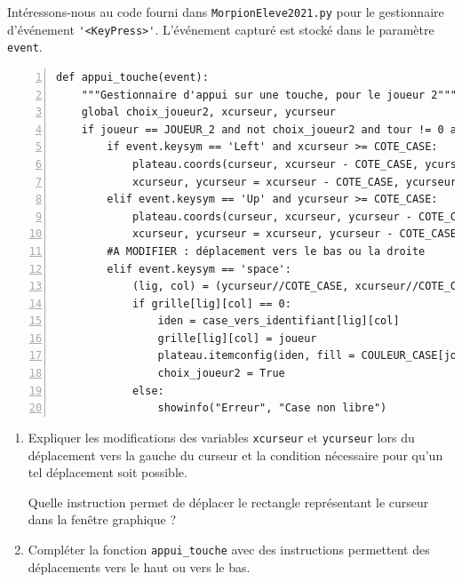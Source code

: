 \documentclass[a4paper, french, 12pt]{article}  %
\newcounter{exo}
\newcounter{exoB}
\newenvironment{exerciceB2}
{\par \bigskip  \noindent \addtocounter{exoB}{1} \hrulefill \quad { \large \textbf{Exercice \theexoB}} \quad \hrulefill \par \medskip }
{\par \bigskip }
\newcounter{def}
\begin{document}
\begin{exerciceB2}{}

Intéressons-nous au code fourni dans \lstinline+MorpionEleve2021.py+ pour le gestionnaire d'événement  \lstinline+'<KeyPress>'+. L'événement capturé est stocké dans le paramètre \lstinline+event+.


\begin{lstlisting}[numbers = left]
def appui_touche(event):
    """Gestionnaire d'appui sur une touche, pour le joueur 2"""
    global choix_joueur2, xcurseur, ycurseur    
    if joueur == JOUEUR_2 and not choix_joueur2 and tour != 0 and vainqueur == 0:
        if event.keysym == 'Left' and xcurseur >= COTE_CASE:
            plateau.coords(curseur, xcurseur - COTE_CASE, ycurseur, xcurseur, ycurseur + COTE_CASE)
            xcurseur, ycurseur = xcurseur - COTE_CASE, ycurseur
        elif event.keysym == 'Up' and ycurseur >= COTE_CASE:
            plateau.coords(curseur, xcurseur, ycurseur - COTE_CASE, xcurseur + COTE_CASE, ycurseur)
            xcurseur, ycurseur = xcurseur, ycurseur - COTE_CASE
        #A MODIFIER : déplacement vers le bas ou la droite
        elif event.keysym == 'space':
            (lig, col) = (ycurseur//COTE_CASE, xcurseur//COTE_CASE)
            if grille[lig][col] == 0:
                iden = case_vers_identifiant[lig][col]
                grille[lig][col] = joueur
                plateau.itemconfig(iden, fill = COULEUR_CASE[joueur])
                choix_joueur2 = True
            else:
                showinfo("Erreur", "Case non libre")
\end{lstlisting}

\begin{enumerate}
	\item Expliquer les modifications des variables \lstinline+xcurseur+ et \lstinline+ycurseur+ lors du déplacement vers la gauche du curseur et la condition nécessaire pour qu'un tel déplacement soit possible.
	
Quelle instruction permet de déplacer le rectangle représentant le curseur dans la fenêtre graphique ?

\item Compléter la fonction \lstinline+appui_touche+ avec des instructions permettent des déplacements vers le haut ou vers le bas.

	
\end{enumerate}


\end{exerciceB2}


\newpage
\end{document}
